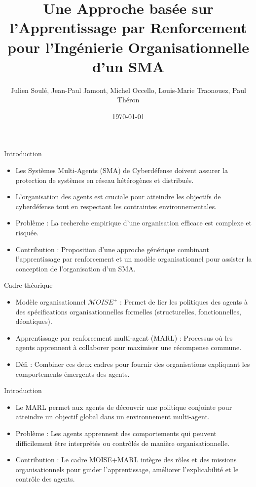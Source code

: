 \documentclass{beamer}
\title{Une Approche basée sur l’Apprentissage par Renforcement pour l’Ingénierie Organisationnelle d’un SMA}
\author{Julien Soulé, Jean-Paul Jamont, Michel Occello, Louis-Marie Traonouez, Paul Théron}
\date{\today}
\begin{document}
\begin{frame}
  \titlepage
\end{frame}

\begin{frame}{Introduction}
    \begin{itemize}
        \item Les Systèmes Multi-Agents (SMA) de Cyberdéfense doivent assurer la protection de systèmes en réseau hétérogènes et distribués.
        \item L'organisation des agents est cruciale pour atteindre les objectifs de cyberdéfense tout en respectant les contraintes environnementales.
        \item Problème : La recherche empirique d'une organisation efficace est complexe et risquée.
        \item Contribution : Proposition d'une approche générique combinant l'apprentissage par renforcement et un modèle organisationnel pour assister la conception de l'organisation d'un SMA.
    \end{itemize}
\end{frame}

\begin{frame}{Cadre théorique}
    \begin{itemize}
        \item Modèle organisationnel $\mathcal{M}OISE^+$ : Permet de lier les politiques des agents à des spécifications organisationnelles formelles (structurelles, fonctionnelles, déontiques).
        \item Apprentissage par renforcement multi-agent (MARL) : Processus où les agents apprennent à collaborer pour maximiser une récompense commune.
        \item Défi : Combiner ces deux cadres pour fournir des organisations expliquant les comportements émergents des agents.
    \end{itemize}
\end{frame}


\begin{frame}{Introduction}
    \begin{itemize}
        \item Le MARL permet aux agents de découvrir une politique conjointe pour atteindre un objectif global dans un environnement multi-agent.
        \item Problème : Les agents apprennent des comportements qui peuvent difficilement être interprétés ou contrôlés de manière organisationnelle.
        \item Contribution : Le cadre MOISE+MARL intègre des rôles et des missions organisationnels pour guider l'apprentissage, améliorer l'explicabilité et le contrôle des agents.
    \end{itemize}
\end{frame}
\end{document}
